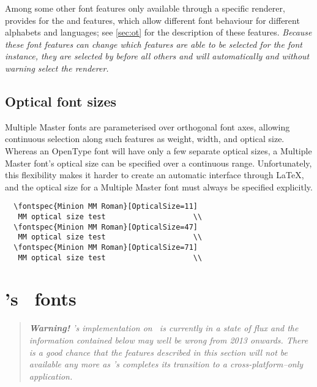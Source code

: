 Among some other font features only available through a specific renderer,
 provides for the  and  features, which allow
different font behaviour for different alphabets and languages; see \vref{sec:ot}
for the description of these features. {\em Because these font features can
change which features are able to be selected for the font instance, they are selected
by  before all others and will automatically and without warning
select the  renderer.}


\subsection{Optical font sizes} \label{sec:aat-opticalsize}

Multiple Master fonts are parameterised over
orthogonal font axes, allowing continuous selection along such
features as weight, width, and optical size.
Whereas an OpenType font will have only a few separate
optical sizes, a Multiple Master font's optical size can be
specified over a continuous range. Unfortunately, this flexibility makes
it harder to create an automatic interface through \LaTeX, and the
optical size for a Multiple Master font must always be specified
explicitly.
\begin{Verbatim}
  \fontspec{Minion MM Roman}[OpticalSize=11]
   MM optical size test                    \\
  \fontspec{Minion MM Roman}[OpticalSize=47]
   MM optical size test                    \\
  \fontspec{Minion MM Roman}[OpticalSize=71]
   MM optical size test                    \\
\end{Verbatim}




\section{\MacOSX's \AAT\ fonts}
\label{sec:aat-features}

\begin{quote}\itshape
\textbf{Warning!}
\XeTeX's implementation on \MacOSX\ is currently in a state of flux and the information contained below may well be wrong from 2013 onwards.
There is a good chance that the features described in this section will not be available any more as \XeTeX's completes its transition to a cross-platform--only application.
\end{quote}

